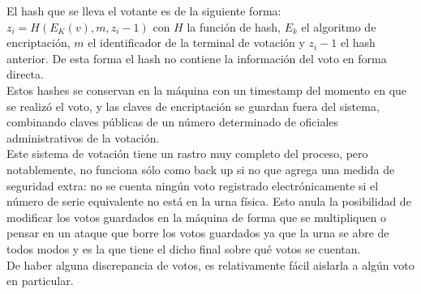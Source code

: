El hash que se lleva el votante es de la siguiente forma: $z_i = H(E_K(v),m,z_i-1)$ con $H$ la función de hash, $E_k$ el algoritmo de encriptación, $m$ el identificador de la terminal de votación y $z_i - 1$ el hash anterior. De esta forma el hash no contiene la información del voto en forma directa. \\

Estos hashes se conservan en la máquina con un timestamp del momento en que se realizó el voto, y las claves de encriptación se guardan fuera del sistema, combinando claves públicas de un número determinado de oficiales administrativos de la votación. \\

Este sistema de votación tiene un rastro muy completo del proceso, pero notablemente, no funciona sólo como back up si no que agrega una medida de seguridad extra: no se cuenta ningún voto registrado electrónicamente si el número de serie equivalente no está en la urna física. Esto anula la posibilidad de modificar los votos guardados en la máquina de forma que se multipliquen o pensar en un ataque que borre los votos guardados ya que la urna se abre de todos modos y es la que tiene el dicho final sobre qué votos se cuentan.\\

De haber alguna discrepancia de votos, es relativamente fácil aislarla a algún voto en particular. \\


